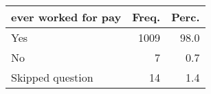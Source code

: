 \begin{table}[ht]
\centering
\begin{tabular}{lrr}
  \hline
ever worked for pay & Freq. & Perc. \\ 
  \hline
Yes & 1009 & 98.0 \\ 
  No &  7 & 0.7 \\ 
  Skipped question & 14 & 1.4 \\ 
   \hline
\end{tabular}
\end{table}
